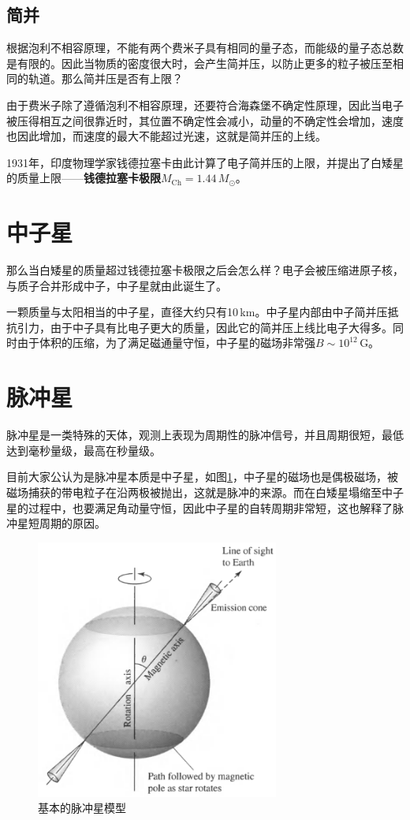 \documentclass[openany]{ctexbook}
\begin{document}
\subsection{简并}
根据泡利不相容原理，不能有两个费米子具有相同的量子态，而能级的量子态总数是有限的。因此当物质的密度很大时，会产生简并压，以防止更多的粒子被压至相同的轨道。那么简并压是否有上限？

由于费米子除了遵循泡利不相容原理，还要符合海森堡不确定性原理，因此当电子被压得相互之间很靠近时，其位置不确定性会减小，动量的不确定性会增加，速度也因此增加，而速度的最大不能超过光速，这就是简并压的上线。

1931年，印度物理学家钱德拉塞卡由此计算了电子简并压的上限，并提出了白矮星的质量上限——\textbf{钱德拉塞卡极限}$M_\mathrm{Ch}=1.44\,M_\odot$。

\section{中子星}
那么当白矮星的质量超过钱德拉塞卡极限之后会怎么样？电子会被压缩进原子核，与质子合并形成中子，中子星就由此诞生了。

一颗质量与太阳相当的中子星，直径大约只有10\,km。中子星内部由中子简并压抵抗引力，由于中子具有比电子更大的质量，因此它的简并压上线比电子大得多。同时由于体积的压缩，为了满足磁通量守恒，中子星的磁场非常强$B\sim10^{12}\,$G。

\section{脉冲星}
脉冲星是一类特殊的天体，观测上表现为周期性的脉冲信号，并且周期很短，最低达到毫秒量级，最高在秒量级。

目前大家公认为是脉冲星本质是中子星，如图\ref{fig:pulsar}，中子星的磁场也是偶极磁场，被磁场捕获的带电粒子在沿两极被抛出，这就是脉冲的来源。而在白矮星塌缩至中子星的过程中，也要满足角动量守恒，因此中子星的自转周期非常短，这也解释了脉冲星短周期的原因。

\begin{figure}[hbt]
  \centering
  \includegraphics[width=8cm]{chapters/16/pulsar}
  \caption{基本的脉冲星模型}
  \label{fig:pulsar}
\end{figure}
\end{document}
